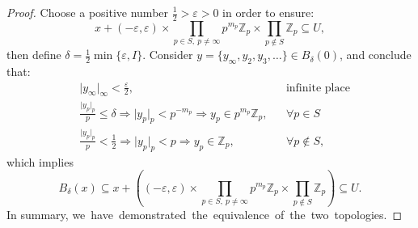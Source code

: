 \documentclass[11pt]{article}
\theoremstyle{remark}
\begin{document}
\begin{proof}
    Choose a positive number $\frac{1}{2}>\varepsilon>0$ in order to ensure:
    \[
    x+(-\varepsilon,\varepsilon)\times\prod_{p\in S,\ p\neq \infty}p^{m_p}\mathbb{Z}_p\times\prod_{p \notin S} \mathbb{Z}_p \subseteq U,
    \]
    then define \(\delta=\frac{1}{2}\min\{\varepsilon, I\}\). Consider $y=\{y_\infty,y_2,y_3,\dots\}\in B_{\delta}(0)$, and conclude that:
    \begin{align*}
          &\lvert y_\infty\rvert_\infty<\frac{\varepsilon}{2},        && \text{infinite place} \\
    &\frac{\lvert y_p\rvert_p}{p}\leq \delta\Rightarrow \lvert y_p\rvert_p<p^{-m_p}\Rightarrow y_p\in p^{m_p}\mathbb{Z}_p,           && \forall p\in S\\
    &\frac{\lvert y_p\rvert_p}{p}<\frac{1}{2}\Rightarrow\lvert y_p\rvert_p <p\Rightarrow y_p\in\mathbb{Z}_p,           &&  \forall p\notin S,
    \end{align*}
    which implies
    \[
    B_{\delta}(x)\subseteq x+\left((-\varepsilon,\varepsilon)\times\prod_{p\in S,\ p\neq \infty}p^{m_p}\mathbb{Z}_p\times\prod_{p \notin S} \mathbb{Z}_p \right)\subseteq U.
    \]
    In summary, we have demonstrated the equivalence of the two topologies. 
\end{proof}
\printbibliography %
\end{document}

